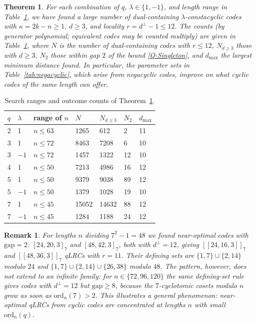\documentclass[journal,onecolumn]{IEEEtran}
\newtheorem{thm}{Theorem}
\newtheorem{remark}{Remark}
\newcommand{\dsb}[1]{[\![#1]\!]}
\begin{document}
\begin{thm}\label{thm:class}
For each combination of $q$, $\lambda\in\{1,-1\}$, and length range in Table~\ref{tab:range}, we have found a large number of dual-containing $\lambda$-constacyclic codes with $\kappa=2k-n\ge 1$, $d\ge 3$, and locality $r=d^\perp-1\le 12$. The counts (by generator polynomial; equivalent codes may be counted multiply) are given in Table~\ref{tab:range}, where $N$ is the number of dual-containing codes with $r\le12$, $N_{d\ge3}$ those with $d\ge3$, $N_2$ those within gap $2$ of the bound \eqref{Q-Singleton}, and $d_{\max}$ the largest minimum distance found. In particular, the parameter sets in Table~\ref{tab:negacyclic}, which arise from negacyclic codes, improve on what cyclic codes of the same length can offer.
\end{thm}

\begin{table}[!htbp]
\caption{Search ranges and outcome counts of Theorem~\ref{thm:class}.}
\label{tab:range}
\centering
\renewcommand{\arraystretch}{1.15}
\begin{tabular}{lllllll}
\toprule
$q$ & $\lambda$ & range of $n$ & $N$ & $N_{d\ge3}$ & $N_2$ & $d_{\max}$ \\
\midrule
2 & 1  & $n\le63$ & 1265  & 612   & 2  & 11 \\
3 & 1  & $n\le72$ & 8463  & 7208  & 6  & 10 \\
3 & $-1$ & $n\le72$ & 1457  & 1322  & 12 & 10 \\
4 & 1  & $n\le50$ & 7213  & 4986  & 16 & 12 \\
5 & 1  & $n\le50$ & 9379  & 9038  & 89 & 12 \\
5 & $-1$ & $n\le50$ & 1379  & 1028  & 19 & 10 \\
7 & 1  & $n\le45$ & 15052 & 14632 & 88 & 12 \\
7 & $-1$ & $n\le45$ & 1284  & 1188  & 24 & 12 \\
\bottomrule
\end{tabular}
\end{table}

\begin{remark}\label{rem:sporadic}
For lengths $n$ dividing $7^2-1=48$ we found near-optimal codes with $\mathrm{gap}=2$: $[24,20,3]_7$ and $[48,42,3]_7$, both with $d^\perp=12$, giving $\dsb{24,16,3}_7$ and $\dsb{48,36,3}_7$ qLRCs with $r=11$. Their defining sets are $\{1,7\}\cup\{2,14\}$ modulo $24$ and $\{1,7\}\cup\{2,14\}\cup\{26,38\}$ modulo $48$. The pattern, however, does not extend to an infinite family: for $n\in\{72,96,120\}$ the same defining-set rule gives codes with $d^\perp=12$ but $\mathrm{gap}\ge 8$, because the $7$-cyclotomic cosets modulo $n$ grow as soon as $\mathrm{ord}_n(7)>2$. This illustrates a general phenomenon: near-optimal qLRCs from cyclic codes are concentrated at lengths $n$ with small $\mathrm{ord}_n(q)$.
\end{remark}
\end{document}

